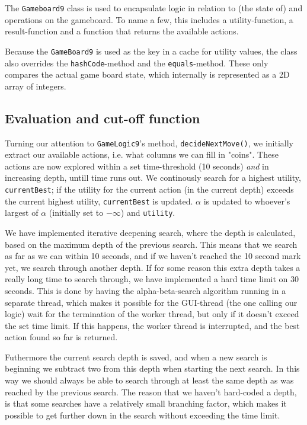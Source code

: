The \texttt{Gameboard9} class is used to encapsulate logic in relation to (the state of) and operations on the gameboard. To name a few, this includes a utility-function, a result-function and a function that returns the available actions.

Because the \texttt{GameBoard9} is used as the key in a cache for utility values, the class also overrides the \texttt{hashCode}-method and the \texttt{equals}-method. These only compares the actual game board state, which internally is represented as a 2D array of integers.

\subsection{Evaluation and cut-off function}

Turning our attention to \texttt{GameLogic9}'s method, \texttt{decideNextMove()}, we initially extract our available actions, i.e. what columns we can fill in "coins". These actions are now explored within a set time-threshold (10 seconds) \textit{and} in increasing depth, untill time runs out. We continously search for a highest utility, \texttt{currentBest}; if the utility for the current action (in the current depth) exceeds the current highest utility, \texttt{currentBest} is updated. $\alpha$ is updated to whoever's largest of $\alpha$ (initially set to $-\infty$) and \texttt{utility}.

We have implemented iterative deepening search, where the depth is calculated, based on the maximum depth of the previous search. This means that we search as far as we can within 10 seconds, and if we haven't reached the 10 second mark yet, we search through another depth. If for some reason this extra depth takes a really long time to search through, we have implemented a hard time limit on 30 seconds. This is done by having the alpha-beta-search algorithm running in a separate thread, which makes it possible for the GUI-thread (the one calling our logic) wait for the termination of the worker thread, but only if it doesn't exceed the set time limit. If this happens, the worker thread is interrupted, and the best action found so far is returned.

Futhermore the current search depth is saved, and when a new search is beginning we subtract two from this depth when starting the next search. In this way we should always be able to search through at least the same depth as was reached by the previous search. The reason that we haven't hard-coded a depth, is that some searches have a relatively small branching factor, which makes it possible to get further down in the search without exceeding the time limit.


